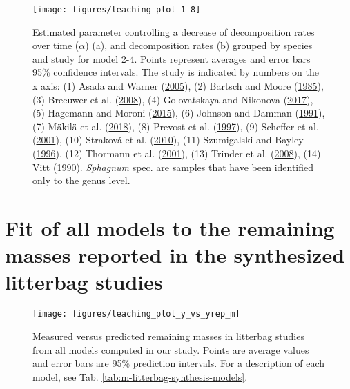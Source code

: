\documentclass[
  12pt,
]{article}
\begin{document}
\begin{figure}[H]

{\centering \texttt{[image: figures/leaching\_plot\_1\_8]} 

}

\caption{Estimated parameter controlling a decrease of decomposition rates over time (\(\alpha\)) (a), and decomposition rates (b) grouped by species and study for model 2-4. Points represent averages and error bars 95\% confidence intervals. The study is indicated by numbers on the x axis: (1) Asada and Warner (\protect\hyperlink{ref-Asada.2005b}{2005}), (2) Bartsch and Moore (\protect\hyperlink{ref-Bartsch.1985}{1985}), (3) Breeuwer et al. (\protect\hyperlink{ref-Breeuwer.2008}{2008}), (4) Golovatskaya and Nikonova (\protect\hyperlink{ref-Golovatskaya.2017}{2017}), (5) Hagemann and Moroni (\protect\hyperlink{ref-Hagemann.2015}{2015}), (6) Johnson and Damman (\protect\hyperlink{ref-Johnson.1991}{1991}), (7) Mäkilä et al. (\protect\hyperlink{ref-Makila.2018}{2018}), (8) Prevost et al. (\protect\hyperlink{ref-Prevost.1997}{1997}), (9) Scheffer et al. (\protect\hyperlink{ref-Scheffer.2001}{2001}), (10) Straková et al. (\protect\hyperlink{ref-Strakova.2010}{2010}), (11) Szumigalski and Bayley (\protect\hyperlink{ref-Szumigalski.1996}{1996}), (12) Thormann et al. (\protect\hyperlink{ref-Thormann.2001}{2001}), (13) Trinder et al. (\protect\hyperlink{ref-Trinder.2008}{2008}), (14) Vitt (\protect\hyperlink{ref-Vitt.1990}{1990}). \emph{Sphagnum} spec. are samples that have been identified only to the genus level.}\label{fig:sup-out-mm-p5-1-8}
\end{figure}

\hypertarget{sup-8}{%
\section{Fit of all models to the remaining masses reported in the synthesized litterbag studies}\label{sup-8}}



\begin{figure}[H]

{\centering \texttt{[image: figures/leaching\_plot\_y\_vs\_yrep\_m]} 

}

\caption{Measured versus predicted remaining masses in litterbag studies from all models computed in our study. Points are average values and error bars are 95\% prediction intervals. For a description of each model, see Tab. \ref{tab:m-litterbag-synthesis-models}.}\label{fig:sup-out-sdm-all-models-p1}
\end{figure}
\end{document}
